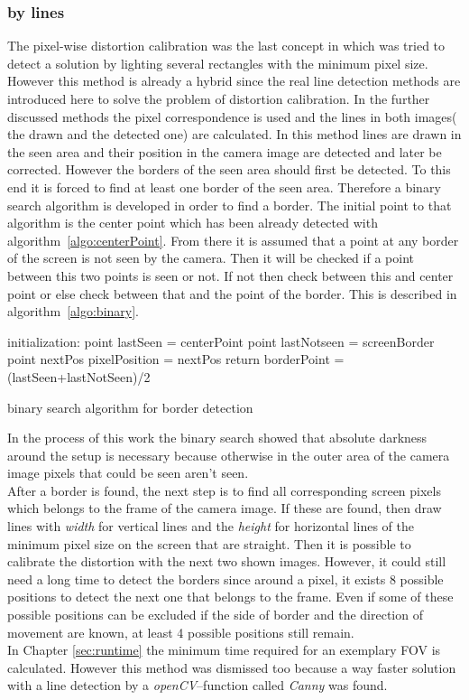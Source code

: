 \documentclass[journal,final,a4paper,twoside]{PS}
\begin{document}
\subsubsection{by lines}
The pixel-wise distortion calibration was the last concept in which was tried to detect a solution by lighting several rectangles with the minimum pixel size. However this method is already a hybrid since the real line detection methods are introduced here to solve the problem of distortion calibration. In the further discussed methods the pixel correspondence is used and the lines in both images( the drawn and the detected one) are calculated. In this method lines are drawn in the seen area and their position in the camera image are detected and later be corrected. However the borders of the seen area should first be detected. To this end it is forced to find at least one border of the seen area. Therefore a binary search algorithm is developed in order to find a border. The initial point to that algorithm is the center point which has been already detected with algorithm~\ref{algo:centerPoint}. From there it is assumed that a point at any border of the screen is not seen by the camera. Then it will be checked if a point between this two points is seen or not. If not then check between this and center point or else check between that and the point of the border. This is described in algorithm~\ref{algo:binary}. 


\begin{algorithm}[h]
 initialization: \;
 point lastSeen = centerPoint\;
 point lastNotseen = screenBorder\;
 point nextPos\;
 pixelPosition = nextPos\;
 return borderPoint = (lastSeen+lastNotSeen)/2\;
 \caption{binary search algorithm for border detection}
 \label{algo:binary}
\end{algorithm} 
In the process of this work the binary search showed that absolute darkness around the setup is necessary because otherwise in the outer area of the camera image pixels that could be seen aren't seen. \\
After a border is found, the next step is to find all corresponding screen pixels which belongs to the frame of the camera image. If these are found, then draw lines with \emph{width} for vertical lines and the \emph{height} for horizontal lines of the minimum pixel size on the screen that are straight. Then it is possible  to calibrate the distortion with the next two shown images. However, it could still need a long time to detect the borders since around a pixel, it exists 8 possible positions to detect the next one that belongs to the frame. Even if some of these possible positions can be excluded if the side of border and the direction of movement are known, at least 4 possible positions still remain. \\%
In Chapter \ref{sec:runtime} the minimum time required for an exemplary FOV is calculated. However this method was dismissed too because a way faster solution with a line detection by a \emph{openCV}--function called \emph{Canny} was found. 
\end{document}
